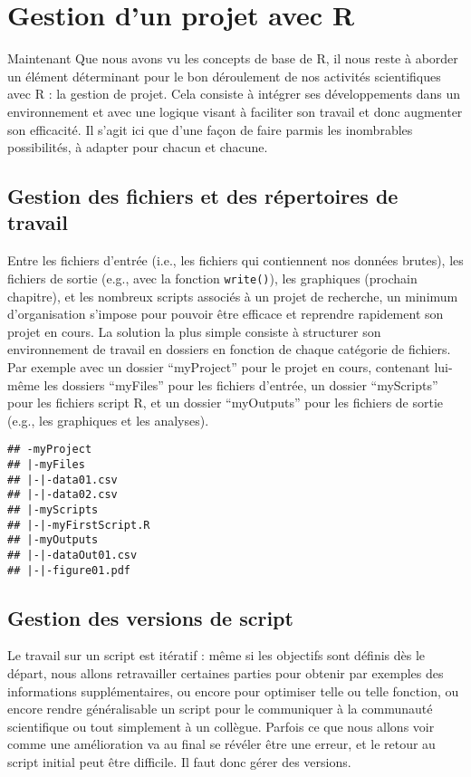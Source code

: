 \documentclass[]{book}
\theoremstyle{definition}
\theoremstyle{definition}
\theoremstyle{definition}
\theoremstyle{remark}
\begin{document}
\hypertarget{project}{\chapter{Gestion d'un projet avec
R}\label{project}}

Maintenant Que nous avons vu les concepts de base de R, il nous reste à
aborder un élément déterminant pour le bon déroulement de nos activités
scientifiques avec R : la gestion de projet. Cela consiste à intégrer
ses développements dans un environnement et avec une logique visant à
faciliter son travail et donc augmenter son efficacité. Il s'agit ici
que d'une façon de faire parmis les inombrables possibilités, à adapter
pour chacun et chacune.

\section{Gestion des fichiers et des répertoires de
travail}\label{gestion-des-fichiers-et-des-repertoires-de-travail}

Entre les fichiers d'entrée (i.e., les fichiers qui contiennent nos
données brutes), les fichiers de sortie (e.g., avec la fonction
\texttt{write()}), les graphiques (prochain chapitre), et les nombreux
scripts associés à un projet de recherche, un minimum d'organisation
s'impose pour pouvoir être efficace et reprendre rapidement son projet
en cours. La solution la plus simple consiste à structurer son
environnement de travail en dossiers en fonction de chaque catégorie de
fichiers. Par exemple avec un dossier ``myProject'' pour le projet en
cours, contenant lui-même les dossiers ``myFiles'' pour les fichiers
d'entrée, un dossier ``myScripts'' pour les fichiers script R, et un
dossier ``myOutputs'' pour les fichiers de sortie (e.g., les graphiques
et les analyses).

\begin{verbatim}
## -myProject
## |-myFiles
## |-|-data01.csv
## |-|-data02.csv
## |-myScripts
## |-|-myFirstScript.R
## |-myOutputs
## |-|-dataOut01.csv
## |-|-figure01.pdf
\end{verbatim}

\section{Gestion des versions de
script}\label{gestion-des-versions-de-script}

Le travail sur un script est itératif : même si les objectifs sont
définis dès le départ, nous allons retravailler certaines parties pour
obtenir par exemples des informations supplémentaires, ou encore pour
optimiser telle ou telle fonction, ou encore rendre généralisable un
script pour le communiquer à la communauté scientifique ou tout
simplement à un collègue. Parfois ce que nous allons voir comme une
amélioration va au final se révéler être une erreur, et le retour au
script initial peut être difficile. Il faut donc gérer des versions.
\end{document}
